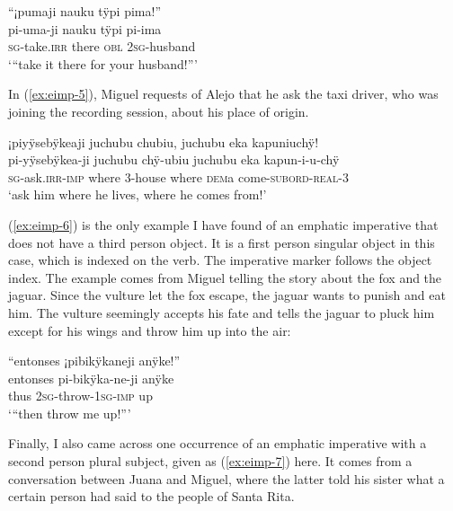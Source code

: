 \ea\label{ex:eimp-4}
\begingl
\glpreamble “¡pumaji nauku tÿpi pima!”\\
\gla pi-uma-ji nauku tÿpi pi-ima\\
\textsc{sg}-take.\textsc{irr} there \textsc{obl} 2\textsc{sg}-husband\\
\glft ‘“take it there for your husband!”’
\endgl
\trailingcitation{[jxx-n101013s-1.413]}
\xe

In (\ref{ex:eimp-5}), Miguel requests of Alejo that he ask the taxi driver, who was joining the recording session, about his place of origin.

\ea\label{ex:eimp-5}
\begingl
\glpreamble ¡piyÿsebÿkeaji juchubu chubiu, juchubu eka kapuniuchÿ!\\
\gla pi-yÿsebÿkea-ji juchubu chÿ-ubiu juchubu eka kapun-i-u-chÿ\\
\textsc{sg}-ask.\textsc{irr}-\textsc{imp} where 3-house where \textsc{dem}a come-\textsc{subord}-\textsc{real}-3\\
\glft ‘ask him where he lives, where he comes from!’
\endgl
\trailingcitation{[mty-p110906l.211-212]}
\xe

(\ref{ex:eimp-6}) is the only example I have found of an emphatic imperative that does not have a third person object. It is a first person singular object in this case, which is indexed on the verb. The imperative marker follows the object index. The example comes from Miguel telling the story about the fox and the jaguar. Since the vulture let the fox escape, the jaguar wants to punish and eat him. The vulture seemingly accepts his fate and tells the jaguar to pluck him except for his wings and throw him up into the air:

\ea\label{ex:eimp-6}
\begingl
\glpreamble “entonses ¡pibikÿkaneji anÿke!”\\
\gla entonses pi-bikÿka-ne-ji anÿke\\
\glb thus 2\textsc{sg}-throw-1\textsc{sg}-\textsc{imp} up\\
\glft ‘“then throw me up!”’
\endgl
\trailingcitation{[jmx-n120429ls-x5.195]}
\xe

Finally, I also came across one occurrence of an emphatic imperative with a second person plural subject, given as (\ref{ex:eimp-7}) here. It comes from a conversation between Juana and Miguel, where the latter told his sister what a certain person had said to the people of Santa Rita.

